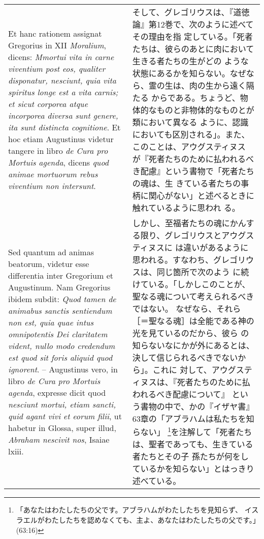 \documentclass[10pt]{jsarticle} %
\begin{document}
\begin{longtable}{p{21em}p{21em}}
Et hanc rationem assignat Gregorius in XII {\it Moralium}, dicens: {\it
 Mmortui vita in carne viventium post eos, qualiter disponatur,
 nesciunt, quia vita spiritus longe est a vita carnis; et sicut corporea
 atque incorporea diversa sunt genere, ita sunt distincta
 cognitione}. Et hoc etiam Augustinus videtur tangere in libro {\it de
 Cura pro Mortuis agenda}, dicens {\it quod animae mortuorum rebus
 viventium non intersunt}.


&
そして、グレゴリウスは、『道徳論』第12巻で、次のように述べてその理由を指
 定している。「死者たちは、彼らのあとに肉において生きる者たちの生がどの
 ような状態にあるかを知らない。なぜなら、霊の生は、肉の生から遠く隔たる
 からである。ちょうど、物体的なものと非物体的なものとが類において異なる
 ように、認識においても区別される」。また、このことは、アウグスティヌス
 が『死者たちのために払われるべき配慮』という書物で「死者たちの魂は、生
 きている者たちの事柄に関心がない」と述べるときに触れているように思われ
 る。

\\


Sed
 quantum ad animas beatorum, videtur esse differentia inter Gregorium et
 Augustinum. Nam Gregorius ibidem subdit: {\it Quod tamen de animabus sanctis
 sentiendum non est, quia quae intus omnipotentis Dei claritatem vident,
 nullo modo credendum est quod sit foris aliquid quod
 ignorent}. -- Augustinus vero, in libro {\it de Cura pro Mortuis agenda},
 expresse dicit quod {\it nesciunt mortui, etiam sancti, quid agant vivi et
 eorum filii}, ut habetur in Glossa, super illud, {\it Abraham nescivit nos},
 Isaiae {\sc lxiii}. 

& しかし、至福者たちの魂にかんする限り、グレゴリウスとアウグスティヌスに
は違いがあるように思われる。すなわち、グレゴリウスは、同じ箇所で次のよう
に続けている。「しかしこのことが、聖なる魂について考えられるべきではない。
なぜなら、それら［＝聖なる魂］は全能である神の光を見ているのだから、彼ら
の知らないなにかが外にあるとは、決して信じられるべきでないから」。これに
対して、アウグスティヌスは、『死者たちのために払われるべき配慮について』
という書物の中で、かの『イザヤ書』63章の「アブラハムは私たちを知らない」
\footnote{「あなたはわたしたちの父です。アブラハムがわたしたちを見知らず、
イスラエルがわたしたちを認めなくても、主よ、あなたはわたしたちの父です。」
(63:16)}を注解して「死者たちは、聖者であっても、生きている者たちとその子
孫たちが何をしているかを知らない」とはっきり述べている。




\end{longtable}
\end{document}
